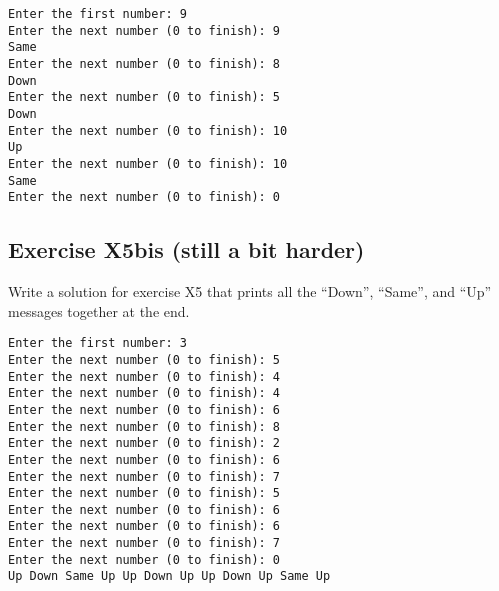 \begin{verbatim}
Enter the first number: 9
Enter the next number (0 to finish): 9
Same
Enter the next number (0 to finish): 8
Down
Enter the next number (0 to finish): 5
Down
Enter the next number (0 to finish): 10
Up
Enter the next number (0 to finish): 10
Same
Enter the next number (0 to finish): 0
\end{verbatim}

\subsection*{Exercise X5bis (still a bit harder)}

Write a solution for exercise X5 that prints all the ``Down'',
``Same'', and ``Up'' messages together at the end. 

\begin{verbatim}
Enter the first number: 3
Enter the next number (0 to finish): 5
Enter the next number (0 to finish): 4
Enter the next number (0 to finish): 4
Enter the next number (0 to finish): 6
Enter the next number (0 to finish): 8
Enter the next number (0 to finish): 2
Enter the next number (0 to finish): 6
Enter the next number (0 to finish): 7
Enter the next number (0 to finish): 5
Enter the next number (0 to finish): 6
Enter the next number (0 to finish): 6
Enter the next number (0 to finish): 7
Enter the next number (0 to finish): 0
Up Down Same Up Up Down Up Up Down Up Same Up 
\end{verbatim}



